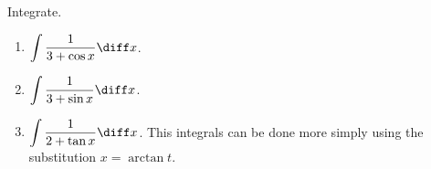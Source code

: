 Integrate.
\begin{enumerate}[ref={\fcProblemRef}]
\item \label{problemInt1/(3+cos x)dx} $\displaystyle \int \frac{1}{3+\cos x}\diff x$.

\item $\displaystyle \int \frac{1}{3+\sin x}\diff x$.
\item $\displaystyle \int \frac{1}{2+\tan x}\diff x$. This integrals can be done more simply using the substitution $x=\arctan t$.
\end{enumerate}